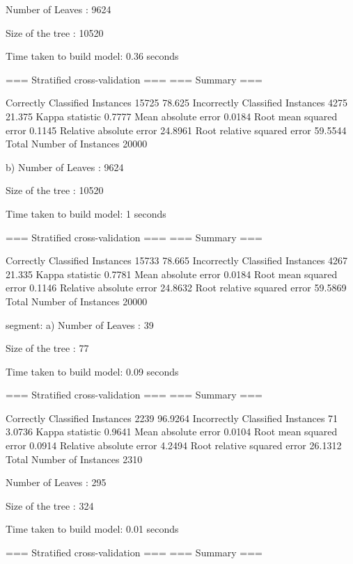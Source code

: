 Number of Leaves  : 	9624

Size of the tree : 	10520


Time taken to build model: 0.36 seconds

=== Stratified cross-validation ===
=== Summary ===

Correctly Classified Instances       15725               78.625  %
Incorrectly Classified Instances      4275               21.375  %
Kappa statistic                          0.7777
Mean absolute error                      0.0184
Root mean squared error                  0.1145
Relative absolute error                 24.8961 %
Root relative squared error             59.5544 %
Total Number of Instances            20000

b)
Number of Leaves  : 	9624

Size of the tree : 	10520


Time taken to build model: 1 seconds

=== Stratified cross-validation ===
=== Summary ===

Correctly Classified Instances       15733               78.665  %
Incorrectly Classified Instances      4267               21.335  %
Kappa statistic                          0.7781
Mean absolute error                      0.0184
Root mean squared error                  0.1146
Relative absolute error                 24.8632 %
Root relative squared error             59.5869 %
Total Number of Instances            20000

segment:
a)
Number of Leaves  : 	39

Size of the tree : 	77


Time taken to build model: 0.09 seconds

=== Stratified cross-validation ===
=== Summary ===

Correctly Classified Instances        2239               96.9264 %
Incorrectly Classified Instances        71                3.0736 %
Kappa statistic                          0.9641
Mean absolute error                      0.0104
Root mean squared error                  0.0914
Relative absolute error                  4.2494 %
Root relative squared error             26.1312 %
Total Number of Instances             2310     


Number of Leaves  : 	295

Size of the tree : 	324


Time taken to build model: 0.01 seconds

=== Stratified cross-validation ===
=== Summary ===

